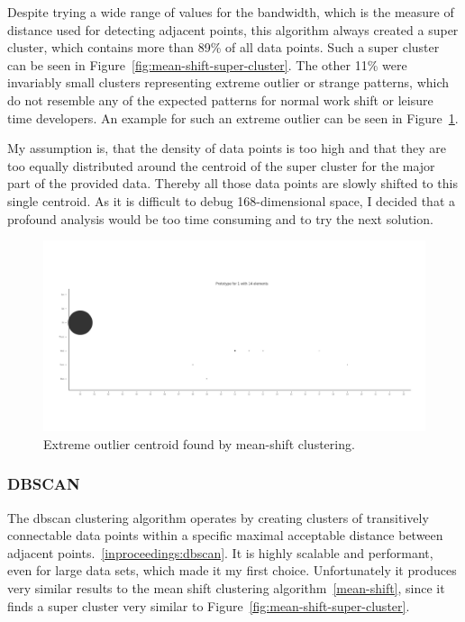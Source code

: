 Despite trying a wide range of values for the bandwidth, which is the measure of distance used for detecting adjacent points, this algorithm always created a super cluster, which contains more than 89\% of all data points.
Such a super cluster can be seen in Figure~\ref{fig:mean-shift-super-cluster}.
The other 11\% were invariably small clusters representing extreme outlier or strange patterns, which do not resemble any of the expected patterns for normal work shift or leisure time developers.
An example for such an extreme outlier can be seen in Figure~\ref{fig:mean-shift-outlier}.

My assumption is, that the density of data points is too high and that they are too equally distributed around the centroid of the super cluster for the major part of the provided data.
Thereby all those data points are slowly shifted to this single centroid.
As it is difficult to debug 168-dimensional space, I decided that a profound analysis would be too time consuming and to try the next solution.

\begin{figure}[H]
    \includegraphics[scale=0.32]{./graphs/analysis-mean-shift/outlier}
    \centering
    \caption{Extreme outlier centroid found by mean-shift clustering.}\label{fig:mean-shift-outlier}
\end{figure}

\subsubsection{DBSCAN}
The \ac{dbscan} clustering algorithm operates by creating clusters of transitively connectable data points within a specific maximal acceptable distance between adjacent points.~\ref{inproceedings:dbscan}.
It is highly scalable and performant, even for large data sets, which made it my first choice.
Unfortunately it produces very similar results to the mean shift clustering algorithm~\ref{mean-shift}, since it finds a super cluster very similar to Figure~\ref{fig:mean-shift-super-cluster}.

